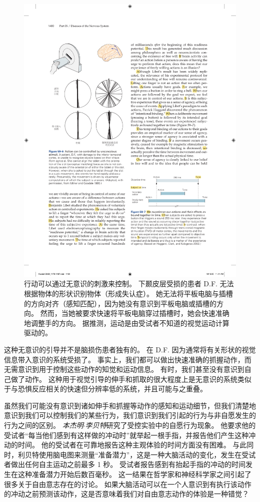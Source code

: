\begin{figure}[htbp]
	\centering
	\includegraphics[width=0.67\linewidth]{chap59/fig_59_6}
	\caption{行动可以通过无意识的刺激来控制。
		下颞皮层受损的患者 D.F. 无法根据物体的形状识别物体（形成失认症）。
		她无法将平板电脑与插槽的方向对齐（感知匹配），因为她没有意识到平板电脑或插槽的方向。
		然而，当她被要求快速将平板电脑穿过插槽时，她会快速准确地调整手的方向。
		据推测，运动是由受试者不知道的视觉运动计算驱动的\cite{milner2006visual}。}
	\label{fig:59_6}
\end{figure}


这种无意识的引导并不是脑损伤患者独有的。
在 D.F. 因为通常将有关形状的视觉信息带入意识的系统受损了。
事实上，我们都可以做出快速准确的抓握动作，而无需意识到用于控制这些动作的知觉和运动信息。
有时，我们甚至没有意识到自己做了动作。
这种用于视觉引导的伸手和抓取的很大程度上是无意识的系统类似于与恐惧反应相关的快速但分辨率低的系统，并且可能与之重叠。


虽然我们可能没有意识到诸如伸手和抓握等动作的感知和运动细节，但我们清楚地意识到我们可以控制我们的某些行为，我们意识到我们引起的行为与非自愿发生的行为之间的区别。
\textit{本杰明$\cdot$李贝特}研究了受控实验中的自愿行为现象。
他要求他的受试者“每当他们感到有这样做的冲动时”就举起一根手指，并报告他们产生这种冲动的时间。
他的受试者在可靠地报告这种主观体验的时间方面没有困难。
与此同时，利贝特使用脑电图来测量“准备潜力”，这是一种大脑活动的变化，发生在受试者做出任何自主运动之前最多 1 秒。
受试者报告感到有抬起手指的冲动的时间发生在这种准备潜力开始后数百毫秒。
这一结果在哲学家和神经科学家之间引起了很多关于自由意志存在的讨论。
如果大脑活动可以在一个人意识到有执行该动作的冲动之前预测该动作，这是否意味着我们对自由意志动作的体验是一种错觉？


